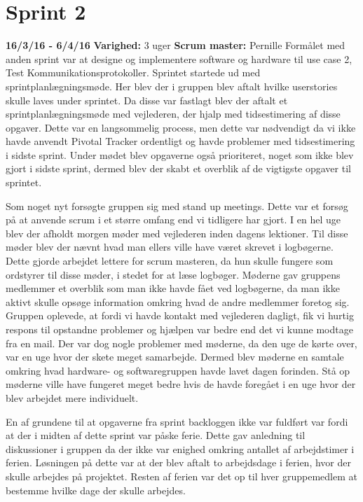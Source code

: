 \documentclass[a4paper,oneside,article]{memoir}
\begin{document}
	
	
	\section{Sprint 2}
	\textbf{16/3/16 - 6/4/16}\newline
	\textbf{Varighed:} 3 uger\newline	
	\textbf{Scrum master: }Pernille \newline
	Formålet med anden sprint var at designe og implementere software og hardware til use case 2, Test Kommunikationsprotokoller. Sprintet startede ud med sprintplanlægningsmøde. Her blev der i gruppen blev aftalt hvilke userstories skulle laves under sprintet. Da disse var fastlagt blev der aftalt et sprintplanlægningsmøde med vejlederen, der hjalp med tidsestimering af disse opgaver. Dette var en langsommelig process, men dette var nødvendigt da vi ikke havde anvendt Pivotal Tracker ordentligt og havde problemer med tidsestimering i sidste sprint. Under mødet blev opgaverne også prioriteret, noget som ikke blev gjort i sidste sprint, dermed blev der skabt et overblik af de vigtigste opgaver til sprintet. \newline
	
	Som noget nyt forsøgte gruppen sig med stand up meetings. Dette var et forsøg på at anvende scrum i et større omfang end vi tidligere har gjort. I en hel uge blev der afholdt morgen møder med vejlederen inden dagens lektioner. Til disse møder blev der nævnt hvad man ellers ville have været skrevet i logbøgerne. Dette gjorde arbejdet lettere for scrum masteren, da hun skulle fungere som ordstyrer til disse møder, i stedet for at læse logbøger. Møderne gav gruppens medlemmer et overblik som man ikke havde fået ved logbøgerne, da man ikke aktivt skulle opsøge information omkring hvad de andre medlemmer foretog sig. Gruppen oplevede, at fordi vi havde kontakt med vejlederen dagligt, fik vi hurtig respons til opstandne problemer og hjælpen var bedre end det vi kunne modtage fra en mail. Der var dog nogle problemer med møderne, da den uge de kørte over, var en uge hvor der skete meget samarbejde. Dermed blev møderne en samtale omkring hvad hardware- og softwaregruppen havde lavet dagen forinden. Stå op møderne ville have fungeret meget bedre hvis de havde foregået i en uge hvor der blev arbejdet mere individuelt. \newline
	
	En af grundene til at opgaverne fra sprint backloggen ikke var fuldført var fordi at der i midten af dette sprint var påske ferie. Dette gav anledning til diskussioner i gruppen da der ikke var enighed omkring antallet af arbejdstimer i ferien. Løsningen på dette var at der blev aftalt to arbejdsdage i ferien, hvor der skulle arbejdes på projektet. Resten af ferien var det op til hver gruppemedlem at bestemme hvilke dage der skulle arbejdes. \newline
	
\end{document}
